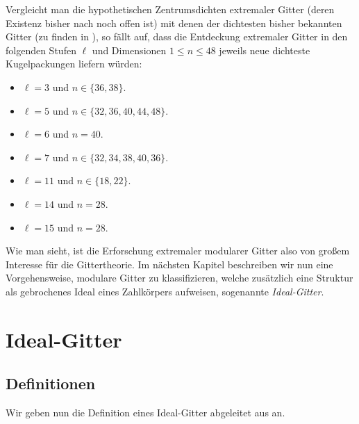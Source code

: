 \documentclass[12pt,a4paper,halfparskip,headsepline,bibtotocnumbered]{scrreprt}
\theoremstyle{nummermitklammern}
\theoremstyle{nonumberbreak}
\begin{document}
Vergleicht man die hypothetischen Zentrumsdichten extremaler Gitter (deren Existenz bisher nach \cite{juergens} noch offen ist) mit denen der dichtesten bisher bekannten Gitter (zu finden in \cite{database}), so fällt auf, dass die Entdeckung extremaler Gitter in den folgenden Stufen $\ell$ und Dimensionen $1 \leq n\leq 48$ jeweils neue dichteste Kugelpackungen liefern würden:
\begin{itemize}
	\item $\ell = 3$ und $n \in \lbrace 36,38 \rbrace$.
	\item $\ell = 5$ und $n \in \lbrace 32, 36, 40, 44, 48 \rbrace$.
	\item $\ell = 6$ und $n = 40$.
	\item $\ell = 7$ und $n \in \lbrace 32, 34, 38, 40, 36 \rbrace$.
	\item $\ell = 11$ und $n \in \lbrace 18, 22 \rbrace$.
	\item $\ell = 14$ und $n = 28$.
	\item $\ell = 15$ und $n = 28$.
\end{itemize}
Wie man sieht, ist die Erforschung extremaler modularer Gitter also von großem Interesse für die Gittertheorie. Im nächsten Kapitel beschreiben wir nun eine Vorgehensweise, modulare Gitter zu klassifizieren, welche zusätzlich eine Struktur als gebrochenes Ideal eines Zahlkörpers aufweisen, sogenannte \textit{Ideal-Gitter}.

\chapter{Ideal-Gitter}

\section{Definitionen}

Wir geben nun die Definition eines Ideal-Gitter abgeleitet aus \cite{fluckiger} an.
\end{document}
